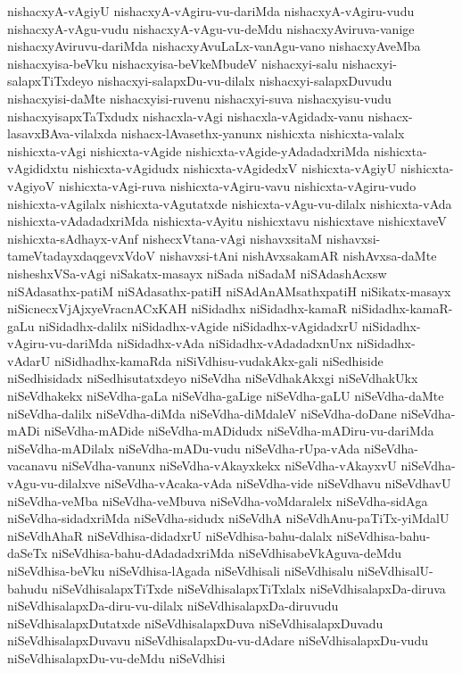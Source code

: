 {nishacxyA-vAgiyU
nishacxyA-vAgiru-vu-dariMda
nishacxyA-vAgiru-vudu
nishacxyA-vAgu-vudu
nishacxyA-vAgu-vu-deMdu
nishacxyAviruva-vanige
nishacxyAviruvu-dariMda
nishacxyAvuLaLx-vanAgu-vano
nishacxyAveMba
nishacxyisa-beVku
nishacxyisa-beVkeMbudeV
nishacxyi-salu
nishacxyi-salapxTiTxdeyo
nishacxyi-salapxDu-vu-dilalx
nishacxyi-salapxDuvudu
nishacxyisi-daMte
nishacxyisi-ruvenu
nishacxyi-suva
nishacxyisu-vudu
nishacxyisapxTaTxdudx
nishacxla-vAgi
nishacxla-vAgidadx-vanu
nishacx-lasavxBAva-vilalxda
nishacx-lAvasethx-yanunx
nishicxta
nishicxta-valalx
nishicxta-vAgi
nishicxta-vAgide
nishicxta-vAgide-yAdadadxriMda
nishicxta-vAgididxtu
nishicxta-vAgidudx
nishicxta-vAgidedxV
nishicxta-vAgiyU
nishicxta-vAgiyoV
nishicxta-vAgi-ruva
nishicxta-vAgiru-vavu
nishicxta-vAgiru-vudo
nishicxta-vAgilalx
nishicxta-vAgutatxde
nishicxta-vAgu-vu-dilalx
nishicxta-vAda
nishicxta-vAdadadxriMda
nishicxta-vAyitu
nishicxtavu
nishicxtave
nishicxtaveV
nishicxta-sAdhayx-vAnf
nishecxVtana-vAgi
nishavxsitaM
nishavxsi-tameVtadayxdaqgevxVdoV
nishavxsi-tAni
nishAvxsakamAR
nishAvxsa-daMte
nisheshxVSa-vAgi
niSakatx-masayx
niSada
niSadaM
niSAdashAcxsw
niSAdasathx-patiM
niSAdasathx-patiH
niSAdAnAMsathxpatiH
niSikatx-masayx
niSicnecxVjAjxyeVracnACxKAH
niSidadhx
niSidadhx-kamaR
niSidadhx-kamaR-gaLu
niSidadhx-dalilx
niSidadhx-vAgide
niSidadhx-vAgidadxrU
niSidadhx-vAgiru-vu-dariMda
niSidadhx-vAda
niSidadhx-vAdadadxnUnx
niSidadhx-vAdarU
niSidhadhx-kamaRda
niSiVdhisu-vudakAkx-gali
niSedhiside
niSedhisidadx
niSedhisutatxdeyo
niSeVdha
niSeVdhakAkxgi
niSeVdhakUkx
niSeVdhakekx
niSeVdha-gaLa
niSeVdha-gaLige
niSeVdha-gaLU
niSeVdha-daMte
niSeVdha-dalilx
niSeVdha-diMda
niSeVdha-diMdaleV
niSeVdha-doDane
niSeVdha-mADi
niSeVdha-mADide
niSeVdha-mADidudx
niSeVdha-mADiru-vu-dariMda
niSeVdha-mADilalx
niSeVdha-mADu-vudu
niSeVdha-rUpa-vAda
niSeVdha-vacanavu
niSeVdha-vanunx
niSeVdha-vAkayxkekx
niSeVdha-vAkayxvU
niSeVdha-vAgu-vu-dilalxve
niSeVdha-vAcaka-vAda
niSeVdha-vide
niSeVdhavu
niSeVdhavU
niSeVdha-veMba
niSeVdha-veMbuva
niSeVdha-voMdaralelx
niSeVdha-sidAga
niSeVdha-sidadxriMda
niSeVdha-sidudx
niSeVdhA
niSeVdhAnu-paTiTx-yiMdalU
niSeVdhAhaR
niSeVdhisa-didadxrU
niSeVdhisa-bahu-dalalx
niSeVdhisa-bahu-daSeTx
niSeVdhisa-bahu-dAdadadxriMda
niSeVdhisabeVkAguva-deMdu
niSeVdhisa-beVku
niSeVdhisa-lAgada
niSeVdhisali
niSeVdhisalu
niSeVdhisalU-bahudu
niSeVdhisalapxTiTxde
niSeVdhisalapxTiTxlalx
niSeVdhisalapxDa-diruva
niSeVdhisalapxDa-diru-vu-dilalx
niSeVdhisalapxDa-diruvudu
niSeVdhisalapxDutatxde
niSeVdhisalapxDuva
niSeVdhisalapxDuvadu
niSeVdhisalapxDuvavu
niSeVdhisalapxDu-vu-dAdare
niSeVdhisalapxDu-vudu
niSeVdhisalapxDu-vu-deMdu
niSeVdhisi
}
